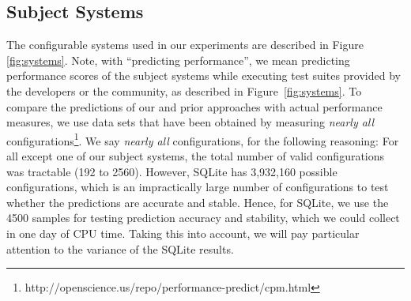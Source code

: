 \documentclass{newsig}
\begin{document}
\subsection{Subject Systems}

The configurable systems used in our experiments are described in Figure \ref{fig:systems}.
Note, with ``predicting performance'', we 
mean predicting performance scores of the subject systems while executing test suites provided by the developers or the community, as described in Figure~\ref{fig:systems}.
To compare the predictions of our and prior approaches with actual performance measures, we use data sets that have been obtained by
measuring {\em nearly all} configurations\footnote{http://openscience.us/repo/performance-predict/cpm.html}.
We say {\em nearly all} configurations, for the following reasoning: For 
all except one of our subject systems, the total number of valid configurations
was tractable (192 to 2560). However,  SQLite has 3,932,160 
possible configurations, which is an impractically large number of configurations to test whether the predictions are accurate and stable. Hence, for SQLite, we use the 4500 samples for testing prediction accuracy and stability, which we could collect in one day of CPU time. Taking this into account, we will pay particular attention to the variance of the SQLite results.
\end{document}
